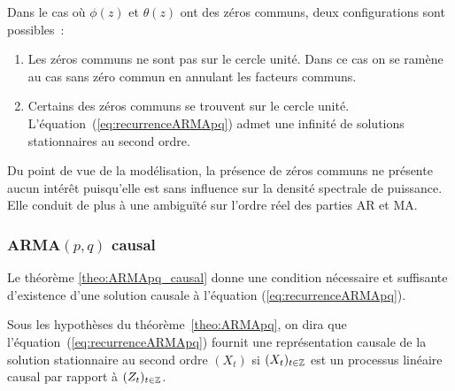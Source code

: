 Dans le cas o\`u $\phi(z)$ et $\theta(z)$ ont des z\'eros communs,
deux configurations sont possibles~:
\begin{enumerate}[label=(\alph*)]
\item Les z\'eros communs ne sont pas sur le cercle unit\'e. Dans ce
cas on se
  ram\`ene au cas sans z\'ero commun en annulant les facteurs communs.
\item Certains des z\'eros communs se trouvent sur le cercle unit\'e.
  L'\'equation~(\ref{eq:recurrenceARMApq}) admet une infinit\'e de solutions
  stationnaires au second ordre.
\end{enumerate}
Du point de vue de la mod\'elisation, la pr\'esence de z\'eros communs
ne pr\'esente aucun int\'er\^{e}t puisqu'elle est sans influence sur
la densit\'e spectrale de puissance. Elle conduit de plus \`a une
ambigu\"{i}t\'e sur l'ordre r\'eel des parties AR et MA.
\subsubsection{ARMA$(p,q)$ causal}
Le th\'eor\`eme \ref{theo:ARMApq_causal} donne une condition n\'ecessaire
et suffisante d'existence d'une solution causale \`a l'\'equation
(\ref{eq:recurrenceARMApq}).

\begin{definition}
  Sous les hypoth\`eses du th\'eor\`eme~\ref{theo:ARMApq}, on dira que
  l'\'equation~(\ref{eq:recurrenceARMApq}) fournit une repr\'esentation causale de
  la solution stationnaire au second ordre $(X_t)$ si $(X_t)_{t\in\mathbb{Z}}$ est
  un processus lin\'eaire causal par rapport \`a $(Z_t)_{t\in\mathbb{Z}}$.
\end{definition}

